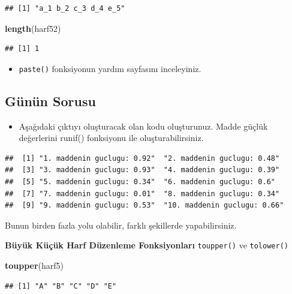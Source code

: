 \documentclass[
  oneside]{book}
\newenvironment{Shaded}{\begin{snugshade}}{\end{snugshade}}
\newcommand{\FunctionTok}[1]{\textcolor[rgb]{0.13,0.29,0.53}{\textbf{#1}}}
\newcommand{\NormalTok}[1]{#1}
\providecommand{\tightlist}{%
  \setlength{\itemsep}{0pt}\setlength{\parskip}{0pt}}
\begin{document}
\begin{verbatim}
## [1] "a_1 b_2 c_3 d_4 e_5"
\end{verbatim}

\begin{Shaded}
\begin{Highlighting}[]
\FunctionTok{length}\NormalTok{(harf52)}
\end{Highlighting}
\end{Shaded}

\begin{verbatim}
## [1] 1
\end{verbatim}

\begin{itemize}
\tightlist
\item
  \texttt{paste()} fonksiyonun yardım sayfasını inceleyiniz.
\end{itemize}

\hypertarget{guxfcnuxfcn-sorusu}{%
\subsection{Günün Sorusu}\label{guxfcnuxfcn-sorusu}}

\begin{itemize}
\tightlist
\item
  Aşağıdaki çıktıyı oluşturacak olan kodu oluşturunuz. Madde güçlük değerlerini runif() fonksiyonu ile oluşturabilirsiniz.
\end{itemize}

\begin{verbatim}
##  [1] "1. maddenin guclugu: 0.92"  "2. maddenin guclugu: 0.48" 
##  [3] "3. maddenin guclugu: 0.93"  "4. maddenin guclugu: 0.39" 
##  [5] "5. maddenin guclugu: 0.34"  "6. maddenin guclugu: 0.6"  
##  [7] "7. maddenin guclugu: 0.01"  "8. maddenin guclugu: 0.34" 
##  [9] "9. maddenin guclugu: 0.53"  "10. maddenin guclugu: 0.66"
\end{verbatim}

Bunun birden fazla yolu olabilir, farklı şekillerde yapabilirsiniz.

\textbf{Büyük Küçük Harf Düzenleme Fonksiyonları} \texttt{toupper()} ve \texttt{tolower()}

\begin{Shaded}
\begin{Highlighting}[]
\FunctionTok{toupper}\NormalTok{(harf5)}
\end{Highlighting}
\end{Shaded}

\begin{verbatim}
## [1] "A" "B" "C" "D" "E"
\end{verbatim}
\end{document}
